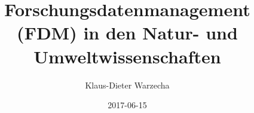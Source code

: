\documentclass[smaller,t]{beamer}
\author[K.-D. Warzecha]{Klaus-Dieter Warzecha}
\date{2017-06-15}
\title[Forschungsdatenmanagement]{Forschungsdatenmanagement (FDM) in den Natur- und Umweltwissenschaften}
\subtitle{}
\begin{document}
\begin{frame}
    \titlepage
\end{frame}




















\end{document}
